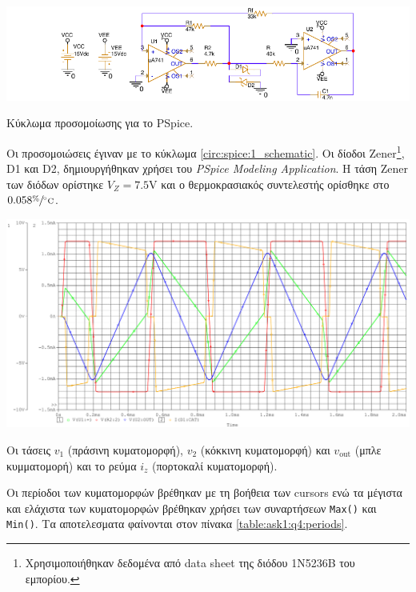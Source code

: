 \begin{center}
	\begin{circuitfig}[H]
		\includegraphics[width=15cm]{spice_01/schematic.pdf}
		\caption{Κύκλωμα προσομοίωσης για το PSpice.}
		\label{circ:spice:1_schematic}
	\end{circuitfig}
\end{center}
\vspace*{-10pt}

Οι προσομοιώσεις έγιναν με το κύκλωμα \ref{circ:spice:1_schematic}. Οι δίοδοι Zener\footnote{Χρησιμοποιήθηκαν δεδομένα από data sheet της διόδου 1N5236B του εμπορίου.}, D1 και D2, δημιουργήθηκαν χρήσει του \textsl{PSpice Modeling Application}. Η τάση Zener των διόδων ορίστηκε $V_Z=7.5\unit{\volt}$ και ο θερμοκρασιακός συντελεστής ορίσθηκε στο $0.058\displaystyle{\sfrac{\%}{\unit{\celsius}}}$.

\begin{chart}[H]
	\begin{center}
		\includegraphics[width=15cm]{spice_01/q4.pdf}
		\caption{Οι τάσεις $v_1$ (πράσινη κυματομορφή), $v_2$ (κόκκινη κυματομορφή) και $v_{\mathrm{out}}$ (μπλε κυμματομορή) και το ρεύμα $i_z$ (πορτοκαλί κυματομορφή).}
		\label{plot:ask1:q4}
	\end{center}
\end{chart}

Οι περίοδοι των κυματομορφών βρέθηκαν με τη βοήθεια των cursors ενώ τα μέγιστα και ελάχιστα των κυματομορφών βρέθηκαν χρήσει των συναρτήσεων \texttt{Max()} και \texttt{Min()}. Τα αποτελεσματα φαίνονται στον πίνακα \ref{table:ask1:q4:periods}.

